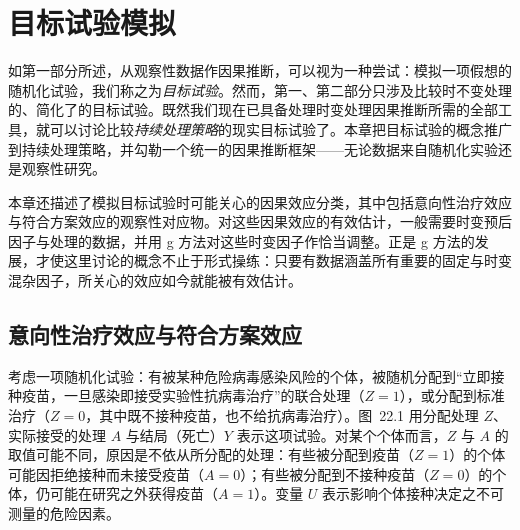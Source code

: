 \chapter{目标试验模拟}

\providecommand{\mnotev}[2]{\marginnote{\textcolor{black!85}{#2}}[#1]}

如第一部分所述，从观察性数据作因果推断，可以视为一种尝试：模拟一项假想的随机化试验，我们称之为\emph{目标试验}。然而，第一、第二部分只涉及比较时不变处理的、简化了的目标试验。既然我们现在已具备处理时变处理因果推断所需的全部工具，就可以讨论比较\emph{持续处理策略}的现实目标试验了。本章把目标试验的概念推广到持续处理策略，并勾勒一个统一的因果推断框架——无论数据来自随机化实验还是观察性研究。

本章还描述了模拟目标试验时可能关心的因果效应分类，其中包括意向性治疗效应与符合方案效应的观察性对应物。对这些因果效应的有效估计，一般需要时变预后因子与处理的数据，并用 g 方法对这些时变因子作恰当调整。正是 g 方法的发展，才使这里讨论的概念不止于形式操练：只要有数据涵盖所有重要的固定与时变混杂因子，所关心的效应如今就能被有效估计。

\section{意向性治疗效应与符合方案效应}

考虑一项随机化试验：有被某种危险病毒感染风险的个体，被随机分配到“立即接种疫苗，一旦感染即接受实验性抗病毒治疗”的联合处理（$Z=1$），或分配到标准治疗（$Z=0$，其中既不接种疫苗，也不给抗病毒治疗）。图~22.1 用分配处理 $Z$、实际接受的处理 $A$ 与结局（死亡）$Y$ 表示这项试验。对某个个体而言，$Z$ 与 $A$ 的取值可能不同，原因是不依从所分配的处理：有些被分配到疫苗（$Z=1$）的个体可能因拒绝接种而未接受疫苗（$A=0$）；有些被分配到不接种疫苗（$Z=0$）的个体，仍可能在研究之外获得疫苗（$A=1$）。变量 $U$ 表示影响个体接种决定之不可测量的危险因素。

\begin{figure}[htbp]
\centering
{}
\caption{}
\label{fig:22.1}
\end{figure}


